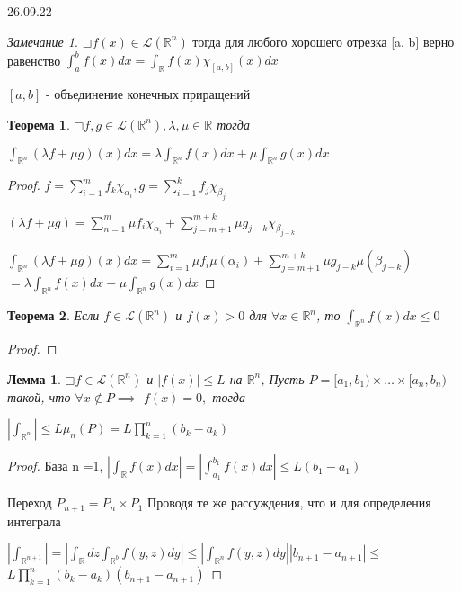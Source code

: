 \documentclass[a4paper, 12pt]{article}
\newcommand\letsymbol{\mathord{\sqsupset}}
\newtheorem{theorem}{Теорема}[section]
\newtheorem{lemma}{Лемма}[section]
\theoremstyle{definition}
\theoremstyle{remark}
\newtheorem*{remark}{Замечание}
\begin{document}
26.09.22
\begin{remark}
     $\letsymbol{}f(x)\in \mathcal{L}(\mathbb{R} ^n)$ тогда для любого хорошего отрезка [a, b]
     верно равенство $\int_a^b f(x)dx = \int_\mathbb{R} f(x)\chi_{[a,b]}(x)dx$

     $[a,b]$ - объединение конечных приращений
\end{remark}
\begin{theorem}
     $\letsymbol{}f, g\in\mathcal{L}(\mathbb{R} ^n), \lambda, \mu \in \mathbb{R} $ 
     тогда

     $\int_{\mathbb{R}^n }(\lambda f + \mu g)(x)dx=\lambda\int_{\mathbb{R}^n }f(x)dx + \mu \int_{\mathbb{R}^n }g(x)dx$
\end{theorem}
\begin{proof}
     $f = \sum_{i = 1}^m f_k \chi_{\alpha_i}, g=\sum_{i = 1}^k f_j \chi_{\beta_j}$

     $(\lambda f + \mu g) = \sum_{n=1}^m \mu f_i \chi_{\alpha_i} + \sum_{j = m+1}^{m+k}\mu g_{j-k}\chi_{\beta_{j-k}}$

     $\int_{\mathbb{R} ^n} (\lambda f + \mu g)(x)dx = \sum_{i=1}^m \mu f_i \mu(\alpha_i)+ \sum_{j = m+1}^{m+k}\mu g_{j-k}\mu(\beta_{j-k})$
    $=\lambda\int_{\mathbb{R} ^n}f(x)dx + \mu\int_{\mathbb{R} ^n}g(x)dx$ 

\end{proof}
\begin{theorem}
     Если $f\in\mathcal{L}(\mathbb{R} ^n)$ и $f(x)>0$ для $\forall x\in\mathbb{R} ^n$, то 
     $\int_{\mathbb{R} ^n} f(x)dx\leq 0$
\end{theorem}
\begin{proof}
     
\end{proof}
\begin{lemma}
     $\letsymbol{}f \in \mathcal{L}(\mathbb{R} ^n)$ и $|f(x)|\leq L$ на $\mathbb{R} ^n$, Пусть 
     $P = [a_1, b_1)\times\dots\times[a_n, b_n)$ такой, что $\forall x\notin P \implies$
     $f(x) = 0,$ тогда 

     $|\int_{\mathbb{R} ^n}|\leq L \mu_n(P) = L \prod_{k = 1}^n (b_k - a_k)$
\end{lemma}
\begin{proof}
     База n =1, $|\int_\mathbb{R} f(x)dx| = |\int_{a_1}^{b_1}f(x)dx|\leq L(b_1 - a_1)$

     Переход $P_{n+1} = P_n \times P_1$
     Проводя те же рассуждения, что и для определения интеграла

     $|\int_{\mathbb{R} ^{n+1}}| = |\int_{\mathbb{R} }dz \int_{\mathbb{R} ^b}f(y, z)dy| \leq|\int_{\mathbb{R} ^n} f(y, z) dy||b_{n+1} - a_{n+1}|\leq$
     $L\prod_{k=1}^n (b_k-a_k)(b_{n+1} - a_{n+1})$
\end{proof}
\end{document}
